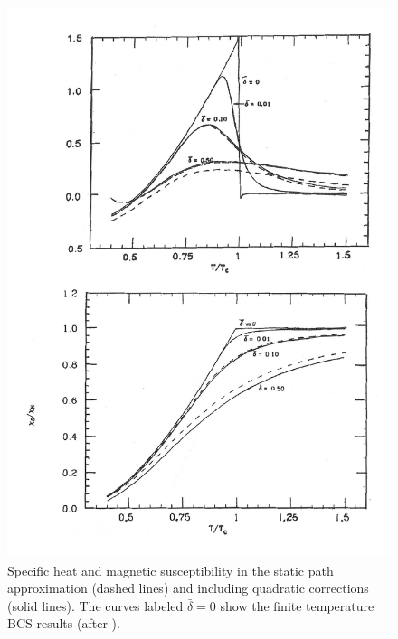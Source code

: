 \begin{figure}[h!]
	\centerline{\includegraphics*[width=12cm,angle=0]{nutshell/figs/fig2E1.pdf}}
	\caption{Specific heat and magnetic susceptibility in the static path approximation (dashed lines) and including quadratic corrections (solid lines). The curves labeled $\bar\delta=0$ show the finite temperature BCS results (after \cite{Lauritzen:93}).}\label{fig2.E.1}
\end{figure}
